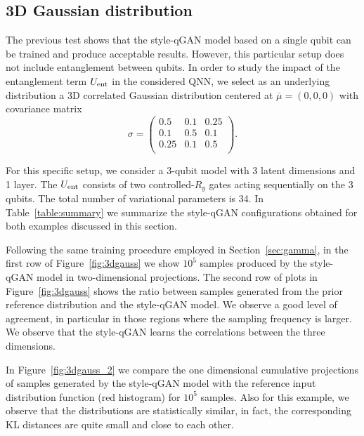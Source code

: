 \documentclass[twocolumn,preprintnumbers,superscriptaddress]{revtex4-2}
\begin{document}
\subsection{3D Gaussian distribution}

The previous test shows that the style-qGAN model based on a single qubit can be
trained and produce acceptable results. However, this particular setup does not
include entanglement between qubits. In order to study the impact of the
entanglement term $U_{\rm ent}$ in the considered QNN, we select as an
underlying distribution a 3D correlated Gaussian distribution centered at
$\overline{\mu}=(0,0,0)$ with covariance matrix
\begin{equation}
  \sigma =
\begin{pmatrix}
  0.5 & 0.1 & 0.25\\
  0.1 & 0.5 & 0.1\\
  0.25 & 0.1 & 0.5\\
  \end{pmatrix}.
\end{equation}

For this specific setup, we consider a 3-qubit model with 3 latent dimensions and
1 layer. The $U_{\rm ent}$ consists of two controlled-$R_{y}$ gates acting sequentially on the 3 qubits.
The total number of variational parameters is 34. In Table~\ref{table:summary}
we summarize the style-qGAN configurations obtained for both examples discussed in
this section.

Following the same training procedure employed in Section~\ref{sec:gamma}, in
the first row of Figure~\ref{fig:3dgauss} we show $10^5$ samples produced by the
style-qGAN model in two-dimensional projections.
%
The second row of plots in Figure~\ref{fig:3dgauss} shows the ratio between
samples generated from the prior reference distribution and the style-qGAN model. We
observe a good level of agreement, in particular in those regions where the
sampling frequency is larger. We observe that the style-qGAN learns the correlations
between the three dimensions.

In Figure~\ref{fig:3dgauss_2} we compare the one dimensional cumulative
projections of samples generated by the style-qGAN model with the reference input
distribution function (red histogram) for $10^5$ samples. Also for this example,
we observe that the distributions are statistically similar, in fact, the
corresponding KL distances are quite small and close to each other.
\end{document}
